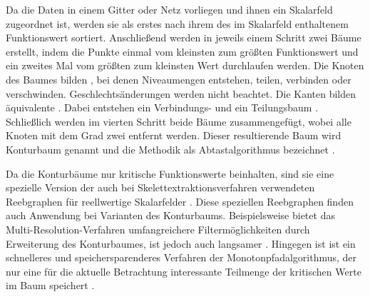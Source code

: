 Da die Daten in einem Gitter oder Netz vorliegen und ihnen ein Skalarfeld zugeordnet ist, werden sie als erstes nach ihrem des im Skalarfeld enthaltenem Funktionswert sortiert. Anschließend werden in jeweils einem Schritt zwei Bäume erstellt, indem die Punkte einmal vom kleinsten zum größten Funktionswert und ein zweites Mal vom größten zum kleinsten Wert durchlaufen werden. Die Knoten des Baumes bilden , bei denen Niveaumengen entstehen, teilen, verbinden oder verschwinden. Geschlechtsänderungen werden nicht beachtet. Die Kanten bilden äquivalente . Dabei entstehen ein Verbindungs- und ein Teilungsbaum \cite{carr2001computingCountourTrees_web}. Schließlich werden im vierten Schritt beide Bäume zusammengefügt, wobei alle Knoten mit dem Grad zwei entfernt werden. Dieser resultierende Baum wird Konturbaum genannt und die Methodik als Abtastalgorithmus bezeichnet \cite{carr2001computingCountourTrees} \cite[S.~176]{chiang2005contourTreesUsingMonotonePaths}.


Da die Konturbäume nur kritische Funktionswerte beinhalten, sind sie eine spezielle Version der auch bei Skelettextraktionsverfahren verwendeten Reebgraphen \cite{pascucci2007computationReebGraph} für reellwertige Skalarfelder \cite[S.~44]{carr2010flexibleIsosurfaces}. Diese speziellen Reebgraphen finden auch Anwendung bei Varianten des Konturbaums. Beispielsweise bietet das Multi-Resolution-Verfahren umfangreichere Filtermöglichkeiten durch Erweiterung des Konturbaumes, ist jedoch auch langsamer \cite{pascucci2004multiResolutionComputation}. Hingegen ist ist ein schnelleres und speichersparenderes Verfahren der Monotonpfadalgorithmus, der nur eine für die aktuelle Betrachtung interessante Teilmenge der kritischen Werte im Baum speichert \cite{chiang2005contourTreesUsingMonotonePaths}.

